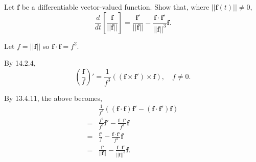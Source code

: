 \documentclass[../hw10]{subfiles}
\begin{document}
Let $\mathbf{f}$ be a differentiable vector-valued function. Show that, where $||\mathbf{f}(t)||\neq0$,
\[\frac{d}{dt}\left[\frac{\mathbf{f}}{||\mathbf{f}||}\right]=\frac{\mathbf{f}'}{||\mathbf{f}||}-\frac{\mathbf{f}\cdot \mathbf{f}'}{{||\mathbf{f}||}^3}\mathbf{f}.\]

Let $f=||\mathbf{f}||$ so $\mathbf{f}\cdot\mathbf{f}=f^2$.

By 14.2.4, \[{\left( \frac{\mathbf{f}}{f} \right)}'=\frac{1}{f^3}\left( \left( \mathbf{f}\times \mathbf{f}' \right) \times \mathbf{f} \right), \quad f\neq0.\]

By 13.4.11, the above becomes,
\begin{align*}
    & \frac{1}{f^3}\left( \left( \mathbf{f}\cdot\mathbf{f} \right)\mathbf{f}'-\left( \mathbf{f}\cdot\mathbf{f}' \right)\mathbf{f} \right) \\
    =&\frac{f^2}{f^3}\mathbf{f}'-\frac{\mathbf{f}\cdot\mathbf{f}'}{f^3}\mathbf{f} \\
    =&\frac{\mathbf{f}'}{f}-\frac{\mathbf{f}\cdot\mathbf{f}'}{f^3}\mathbf{f} \\
    =&\frac{\mathbf{f}'}{||\mathbf{f}||}-\frac{\mathbf{f}\cdot\mathbf{f}'}{{||\mathbf{f}||}^3}\mathbf{f}. \\
\end{align*}
\end{document}
